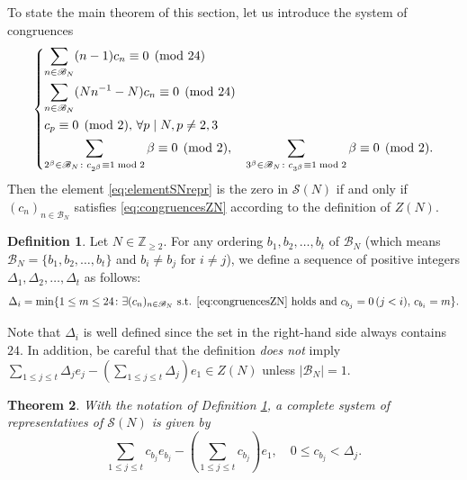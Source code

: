 \documentclass[12pt]{amsart}
\numberwithin{equation}{section}
\theoremstyle{plain}
\newtheorem{thm}{Theorem}[section]
\theoremstyle{definition}
\newtheorem{deff}[thm]{Definition}
\theoremstyle{remark}
\newcommand*\abs[1]{\lvert#1\rvert}
\newcommand\numgeq[2]{\mathbb{#1}_{\geq #2}}
\begin{document}
To state the main theorem of this section, let us introduce the system of congruences
\begin{equation}
\label{eq:congruencesZN}
\begin{dcases}
\sum_{n\in\mathscr{B}_N}(n-1)c_n\equiv0 \pmod{24}\\
\sum_{n\in\mathscr{B}_N}(Nn^{-1}-N)c_n\equiv0 \pmod{24}\\
c_p\equiv0\pmod{2},\,\forall p\mid N,p\neq2,3\\
\sum_{2^\beta\in\mathscr{B}_N\colon c_{2^\beta}\equiv1\bmod2}\beta\equiv0\pmod{2},\quad \sum_{3^\beta\in\mathscr{B}_N\colon c_{3^\beta}\equiv1\bmod2}\beta\equiv0\pmod{2}.
\end{dcases}
\end{equation}
Then the element \eqref{eq:elementSNrepr} is the zero in $\mathscr{S}(N)$ if and only if $(c_n)_{n\in\mathscr{B}_N}$ satisfies \eqref{eq:congruencesZN} according to the definition of $Z(N)$.
\begin{deff}
\label{deff:DeltaSequence}
Let $N\in\numgeq{Z}{2}$. For any ordering $b_1,b_2,\dots,b_t$ of $\mathscr{B}_N$ (which means $\mathscr{B}_N=\{b_1,b_2,\dots,b_t\}$ and $b_i\neq b_j$ for $i\neq j$), we define a sequence of positive integers $\Delta_1,\Delta_2,\dots,\Delta_t$ as follows:
\begin{equation*}
\Delta_i=\min\{1\leq m\leq 24\colon\exists(c_n)_{n\in\mathscr{B}_N}\text{ s.t. \eqref{eq:congruencesZN} holds and }c_{b_j}=0\,(j<i),\,c_{b_i}=m\}.
\end{equation*}
\end{deff}
Note that $\Delta_i$ is well defined since the set in the right-hand side always contains $24$. In addition, be careful that the definition \emph{does not} imply $\sum_{1\leq j\leq t}\Delta_{j}e_{j}-\left(\sum_{1\leq j\leq t}\Delta_{j}\right)e_1\in Z(N)$ unless $\abs{\mathscr{B}_N}=1$.
\begin{thm}
\label{thm:SNrepr}
With the notation of Definition \ref{deff:DeltaSequence}, a complete system of representatives of $\mathscr{S}(N)$ is given by
\begin{equation}
\label{eq:SNrepr}
\sum_{1\leq j\leq t}c_{b_j}e_{b_j}-\left(\sum_{1\leq j\leq t}c_{b_j}\right)e_1,\quad 0\leq c_{b_j}<\Delta_j.
\end{equation}
\end{thm}
\end{document}

